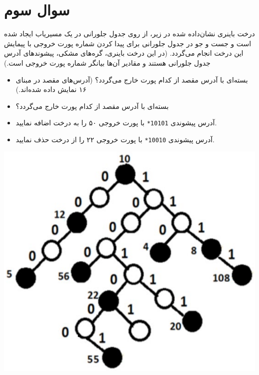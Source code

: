 \section{سوال سوم}


درخت باینری نشان‌داده شده در زیر، از روی جدول جلورانی در یک مسیریاب ایجاد شده است و جست و جو در جدول جلورانی برای پیدا کردن شماره پورت خروجی با پیمایش این درخت انجام می‌گردد. (در این درخت باینری، گره‌های مشکی، پیشوندهای آدرس جدول جلورانی هستند و مقادیر آن‌ها بیانگر شماره پورت خروجی است.)

\begin{itemize}
	\item بسته‌ای با آدرس مقصد  از کدام پورت خارج می‌گردد؟ (آدرس‌های مقصد در مبنای ۱۶ نمایش داده شده‌اند.)
	
	\item بسته‌ای با آدرس مقصد  از کدام پورت خارج می‌گردد؟
	
	\item آدرس پیشوندی \texttt{10101*} با پورت خروجی ۵۰ را به درخت اضافه نمایید.
	
	\item آدرس پیشوندی \texttt{10010*} با پورت خروجی ۲۲ را از درخت حذف نمایید.
\end{itemize}


\begin{center}
	\includegraphics*[width=0.5\linewidth]{pics/img1.png}
\end{center}